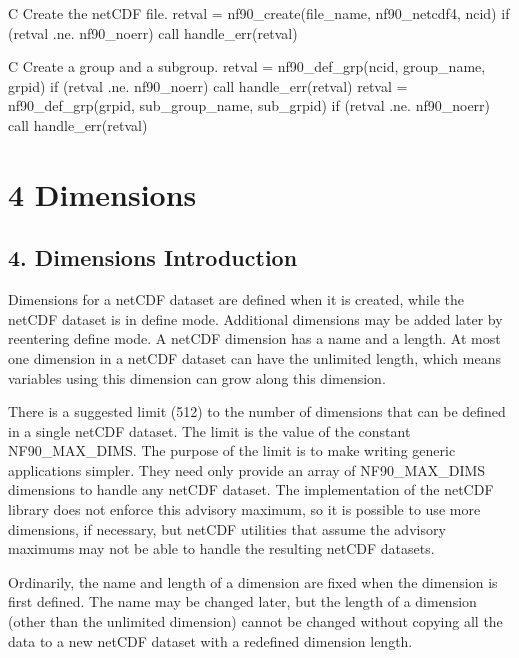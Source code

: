\begin{DoxyCode}
\textcolor{comment}{C     Create the netCDF file.}
      retval = nf90\_create(file\_name, nf90\_netcdf4, ncid)
      \textcolor{keywordflow}{if} (retval .ne. nf90\_noerr) \textcolor{keyword}{call }handle\_err(retval)

\textcolor{comment}{C     Create a group and a subgroup.}
      retval = nf90\_def\_grp(ncid, group\_name, grpid)
      \textcolor{keywordflow}{if} (retval .ne. nf90\_noerr) \textcolor{keyword}{call }handle\_err(retval)
      retval = nf90\_def\_grp(grpid, sub\_group\_name, sub\_grpid)
      \textcolor{keywordflow}{if} (retval .ne. nf90\_noerr) \textcolor{keyword}{call }handle\_err(retval)
\end{DoxyCode}
 \hypertarget{f90_dimensions}{}\section{4 Dimensions}\label{f90_dimensions}
\hypertarget{f90_dimensions_f90-dimensions-introduction}{}\subsection{4. Dimensions Introduction }\label{f90_dimensions_f90-dimensions-introduction}
Dimensions for a net\+C\+DF dataset are defined when it is created, while the net\+C\+DF dataset is in define mode. Additional dimensions may be added later by reentering define mode. A net\+C\+DF dimension has a name and a length. At most one dimension in a net\+C\+DF dataset can have the unlimited length, which means variables using this dimension can grow along this dimension.

There is a suggested limit (512) to the number of dimensions that can be defined in a single net\+C\+DF dataset. The limit is the value of the constant N\+F90\+\_\+\+M\+A\+X\+\_\+\+D\+I\+MS. The purpose of the limit is to make writing generic applications simpler. They need only provide an array of N\+F90\+\_\+\+M\+A\+X\+\_\+\+D\+I\+MS dimensions to handle any net\+C\+DF dataset. The implementation of the net\+C\+DF library does not enforce this advisory maximum, so it is possible to use more dimensions, if necessary, but net\+C\+DF utilities that assume the advisory maximums may not be able to handle the resulting net\+C\+DF datasets.

Ordinarily, the name and length of a dimension are fixed when the dimension is first defined. The name may be changed later, but the length of a dimension (other than the unlimited dimension) cannot be changed without copying all the data to a new net\+C\+DF dataset with a redefined dimension length.

